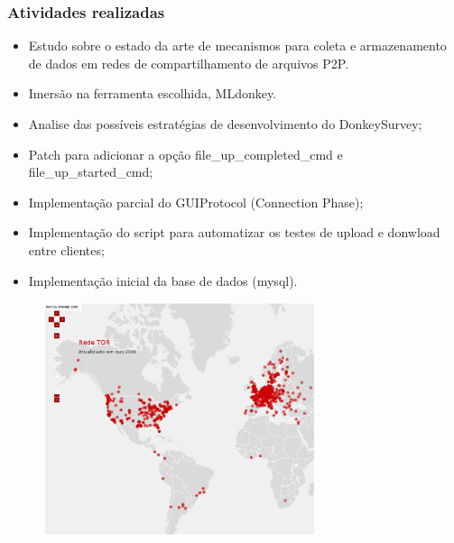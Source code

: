 \documentclass{beamer}
\newenvironment{changemargin}[2]{%
\begin{list}{}{%
\setlength{\leftmargin}{#1}%
\setlength{\rightmargin}{#2}%
\setlength{\listparindent}{\parindent}%
\setlength{\itemindent}{\parindent}%
\setlength{\parsep}{\parskip}%
}%
\item[]}{\end{list}}
\begin{document}
\begin{frame}
  \frametitle{Atividades realizadas}
\hspace{0.25in}
 \begin{itemize}
  \item Estudo sobre o estado da arte de mecanismos para coleta e armazenamento de dados em redes de compartilhamento de arquivos P2P.
  \item Imersão na ferramenta escolhida, MLdonkey.
  \item Analise das possíveis estratégias de desenvolvimento do DonkeySurvey;
  \item Patch para adicionar a opção file\_up\_completed\_cmd e file\_up\_started\_cmd;
  \item Implementação parcial do GUIProtocol (Connection Phase);
  \item Implementação do script para automatizar os testes de upload e donwload entre clientes;
  \item Implementação inicial da base de dados (mysql). 
 \end{itemize}
\end{frame}

\begin{frame}
\begin{changemargin}{-2cm}{-2cm}
  \begin{figure}
    \includegraphics[width=300px]{img/ammap_tor.ps}
  \end{figure} 
\end{changemargin}
\end{frame}
\end{document}
